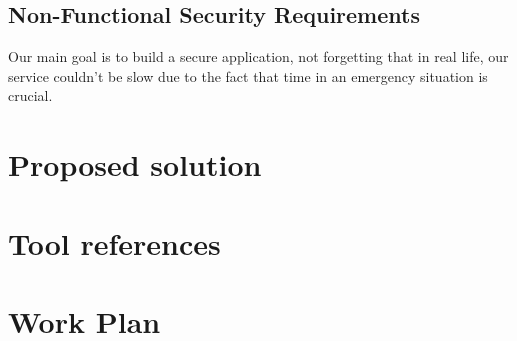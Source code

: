 \documentclass[a4paper,titlepage,11pt]{article}
\begin{document}
	\subsection{Non-Functional Security Requirements}
			Our main goal is to build a secure application, not forgetting that in real life, our service couldn't be slow due to the fact that time in an emergency situation is crucial.


\section{Proposed solution}

\section{Tool references}

\section{Work Plan}
\end{document}
